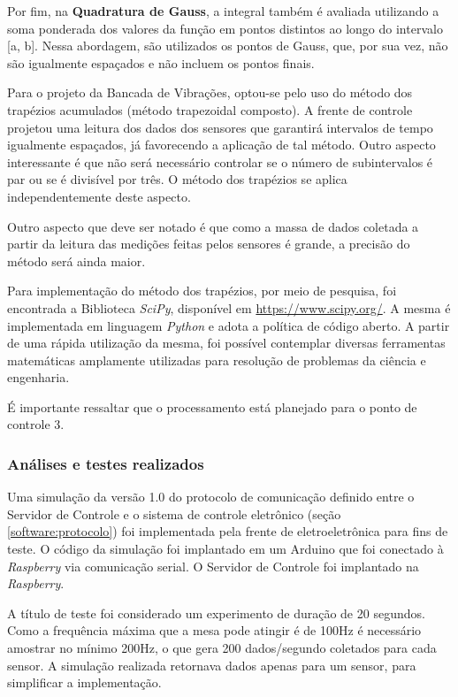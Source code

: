 Por fim, na \textbf{Quadratura de Gauss}, a integral também é avaliada utilizando a soma ponderada dos valores da função em pontos distintos 
ao longo do intervalo [a, b]. Nessa abordagem, são utilizados os pontos de Gauss, que, por sua vez, não são igualmente espaçados e não incluem 
os pontos finais.

Para o projeto da Bancada de Vibrações, optou-se pelo uso do método dos trapézios acumulados (método trapezoidal composto). A frente de 
controle projetou uma leitura dos dados dos sensores que garantirá intervalos de tempo igualmente espaçados, já favorecendo a aplicação de 
tal método. Outro aspecto interessante é que não será necessário controlar se o número de subintervalos é par ou se é divisível por três. 
O método dos trapézios se aplica independentemente deste aspecto.

Outro aspecto que deve ser notado é que como a massa de dados coletada a partir da leitura das medições feitas pelos sensores é grande, a
precisão do método será ainda maior.

Para implementação do método dos trapézios, por meio de pesquisa, foi encontrada a Biblioteca \textit{SciPy}, disponível em
\href{https://www.scipy.org/}{https://www.scipy.org/}. A mesma é implementada em linguagem \textit{Python} e adota a política
de código aberto. A partir de uma rápida utilização da mesma, foi possível contemplar diversas ferramentas matemáticas amplamente
utilizadas para resolução de problemas da ciência e engenharia.

É importante ressaltar que o processamento está planejado para o ponto de controle 3.

\subsubsection{\textbf{Análises e testes realizados}}

Uma simulação da versão 1.0 do protocolo de comunicação definido entre o Servidor de Controle e o sistema de controle eletrônico (seção \ref{software:protocolo})
foi implementada pela frente de eletroeletrônica para fins de teste. O código da simulação foi implantado em um Arduino que foi conectado
à \textit{Raspberry} via comunicação serial. O Servidor de Controle foi implantado na \textit{Raspberry}.

A título de teste foi considerado um experimento de duração de 20 segundos.
Como a frequência máxima que a mesa pode atingir é de 100Hz é necessário amostrar no mínimo 200Hz,
o que gera 200 dados/segundo coletados para cada sensor.
A simulação realizada retornava dados apenas para um sensor, para simplificar a implementação.

